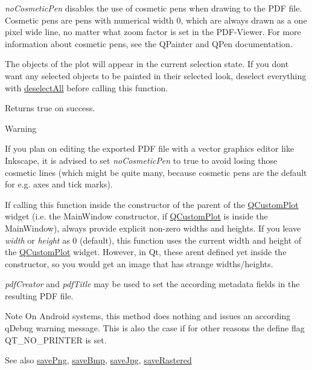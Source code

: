{\itshape no\+Cosmetic\+Pen} disables the use of cosmetic pens when drawing to the P\+D\+F file. Cosmetic pens are pens with numerical width 0, which are always drawn as a one pixel wide line, no matter what zoom factor is set in the P\+D\+F-\/\+Viewer. For more information about cosmetic pens, see the Q\+Painter and Q\+Pen documentation.

The objects of the plot will appear in the current selection state. If you don\textquotesingle{}t want any selected objects to be painted in their selected look, deselect everything with \hyperlink{class_q_custom_plot_a9d4808ab925b003054085246c92a257c}{deselect\+All} before calling this function.

Returns true on success.

\begin{DoxyWarning}{Warning}
\begin{DoxyItemize}
\item If you plan on editing the exported P\+D\+F file with a vector graphics editor like Inkscape, it is advised to set {\itshape no\+Cosmetic\+Pen} to true to avoid losing those cosmetic lines (which might be quite many, because cosmetic pens are the default for e.\+g. axes and tick marks). \item If calling this function inside the constructor of the parent of the \hyperlink{class_q_custom_plot}{Q\+Custom\+Plot} widget (i.\+e. the Main\+Window constructor, if \hyperlink{class_q_custom_plot}{Q\+Custom\+Plot} is inside the Main\+Window), always provide explicit non-\/zero widths and heights. If you leave {\itshape width} or {\itshape height} as 0 (default), this function uses the current width and height of the \hyperlink{class_q_custom_plot}{Q\+Custom\+Plot} widget. However, in Qt, these aren\textquotesingle{}t defined yet inside the constructor, so you would get an image that has strange widths/heights.\end{DoxyItemize}
{\itshape pdf\+Creator} and {\itshape pdf\+Title} may be used to set the according metadata fields in the resulting P\+D\+F file.
\end{DoxyWarning}
\begin{DoxyNote}{Note}
On Android systems, this method does nothing and issues an according q\+Debug warning message. This is also the case if for other reasons the define flag Q\+T\+\_\+\+N\+O\+\_\+\+P\+R\+I\+N\+T\+E\+R is set.
\end{DoxyNote}
\begin{DoxySeeAlso}{See also}
\hyperlink{class_q_custom_plot_a7636261aff1f6d25c9da749ece3fc8b8}{save\+Png}, \hyperlink{class_q_custom_plot_a6629d9e8e6da4bf18055ee0257fdce9a}{save\+Bmp}, \hyperlink{class_q_custom_plot_a490c722092d1771e8ce4a7a73dfd84ab}{save\+Jpg}, \hyperlink{class_q_custom_plot_ab528b84cf92baabe29b1d0ef2f77c93e}{save\+Rastered} 
\end{DoxySeeAlso}



